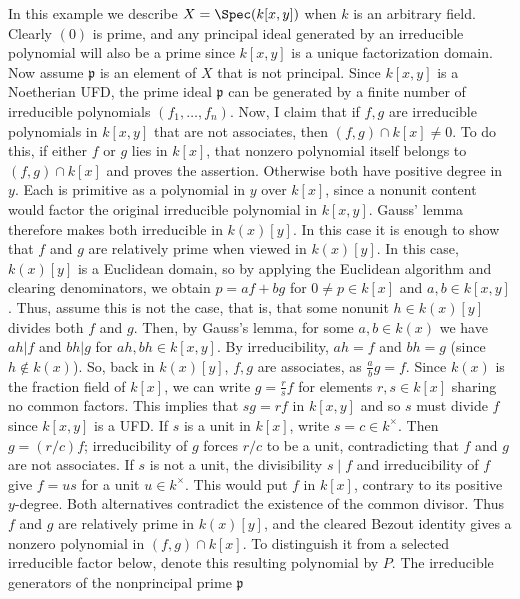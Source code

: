 \begin{example}
\label{editorial-source-example-spec-kxy}
In this example we describe $X = \Spec(k[x, y])$
when $k$ is an arbitrary field.
Clearly $(0)$ is prime, and any principal ideal generated by an
irreducible polynomial will also be a prime since $k[x, y]$ is a
unique factorization domain. Now assume $\mathfrak p$ is an
element of $X$ that is not principal. Since $k[x, y]$ is a
Noetherian UFD, the prime ideal $\mathfrak p$ can be generated
by a finite number of irreducible polynomials $(f_1, \ldots, f_n)$.
Now, I claim that if $f, g$ are irreducible polynomials in $k[x, y]$
that are not associates, then $(f, g) \cap k[x] \neq 0$. To do this,
if either $f$ or $g$ lies in $k[x]$, that nonzero polynomial
itself belongs to $(f,g)\cap k[x]$ and proves the assertion.
Otherwise both have positive degree in $y$. Each is primitive as
a polynomial in $y$ over $k[x]$, since a nonunit content would
factor the original irreducible polynomial in $k[x,y]$.
Gauss' lemma therefore makes both irreducible in $k(x)[y]$.
In this case it is enough to show that $f$ and $g$ are relatively prime when
viewed in $k(x)[y]$. In this case, $k(x)[y]$ is a Euclidean domain,
so by applying the Euclidean algorithm and clearing denominators, we
obtain $p = af + bg$ for $0 \ne p \in k[x]$ and $a, b \in k[x, y]$. Thus, assume this is not
the case, that is, that some nonunit $h \in k(x)[y]$ divides both
$f$ and $g$. Then, by Gauss's lemma, for some $a, b \in k(x)$ we
have $ah | f$ and $bh | g$ for $ah, bh \in k[x, y]$. By
irreducibility, $ah = f$ and
$bh = g$ (since $h \notin k(x)$). So, back in $k(x)[y]$, $f, g $
are associates, as $\frac{a}{b} g = f$. Since
$k(x)$ is the fraction field of $k[x]$, we can write $g = \frac{r}{s} f $
for elements $r , s \in k[x]$ sharing no common factors. This
implies that $sg = rf$ in $k[x, y]$ and so $s$ must divide $f$
since $k[x,y]$ is a UFD. If $s$ is a unit in $k[x]$, write
$s=c\in k^\times$. Then $g=(r/c)f$; irreducibility of $g$
forces $r/c$ to be a unit, contradicting that $f$ and $g$ are
not associates. If $s$ is not a unit, the divisibility $s\mid f$
and irreducibility of $f$ give $f=us$ for a unit $u\in k^\times$.
This would put $f$ in $k[x]$, contrary to its positive $y$-degree.
Both alternatives contradict the existence of the common divisor.
Thus $f$ and $g$ are relatively prime in $k(x)[y]$, and the
cleared Bezout identity gives a nonzero polynomial in $(f,g)\cap k[x]$.
To distinguish it from a selected irreducible factor below, denote
this resulting polynomial by $P$.
The irreducible generators of the nonprincipal prime $\mathfrak p$

\end{example}
